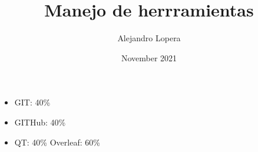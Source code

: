 \documentclass{article}
\title{Manejo de herrramientas}
\author{Alejandro Lopera }
\date{November 2021}
\begin{document}
\maketitle

\centering
    \begin{itemize}
        \item  GIT: 40\%
        \item  GITHub: 40\%
        \item  QT: 40\%
        \ite  Overleaf: 60\%
    \end{itemize}
\end{document}
